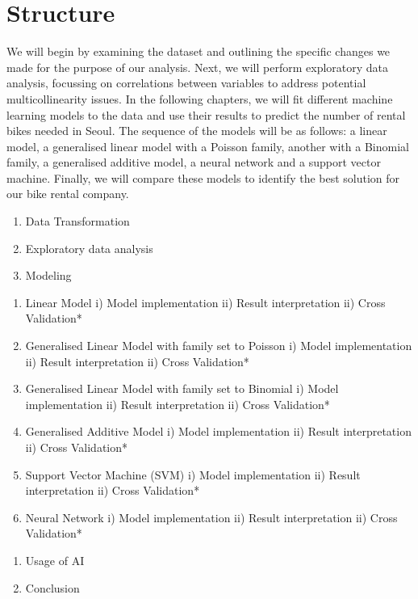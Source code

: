 \documentclass[
]{article}
\begin{document}
\section{Structure}\label{structure}

We will begin by examining the dataset and outlining the specific
changes we made for the purpose of our analysis. Next, we will perform
exploratory data analysis, focussing on correlations between variables
to address potential multicollinearity issues. In the following
chapters, we will fit different machine learning models to the data and
use their results to predict the number of rental bikes needed in Seoul.
The sequence of the models will be as follows: a linear model, a
generalised linear model with a Poisson family, another with a Binomial
family, a generalised additive model, a neural network and a support
vector machine. Finally, we will compare these models to identify the
best solution for our bike rental company.

\begin{enumerate}
\def\labelenumi{\arabic{enumi}.}
\setcounter{enumi}{1}
\item
  Data Transformation
\item
  Exploratory data analysis
\item
  Modeling
\end{enumerate}

\begin{enumerate}
\def\labelenumi{\alph{enumi})}
\item
  Linear Model i) Model implementation ii) Result interpretation ii)
  Cross Validation*
\item
  Generalised Linear Model with family set to Poisson i) Model
  implementation ii) Result interpretation ii) Cross Validation*
\item
  Generalised Linear Model with family set to Binomial i) Model
  implementation ii) Result interpretation ii) Cross Validation*
\item
  Generalised Additive Model i) Model implementation ii) Result
  interpretation ii) Cross Validation*
\item
  Support Vector Machine (SVM) i) Model implementation ii) Result
  interpretation ii) Cross Validation*
\item
  Neural Network i) Model implementation ii) Result interpretation ii)
  Cross Validation*
\end{enumerate}

\begin{enumerate}
\def\labelenumi{\arabic{enumi}.}
\setcounter{enumi}{4}
\item
  Usage of AI
\item
  Conclusion
\end{enumerate}
\end{document}
